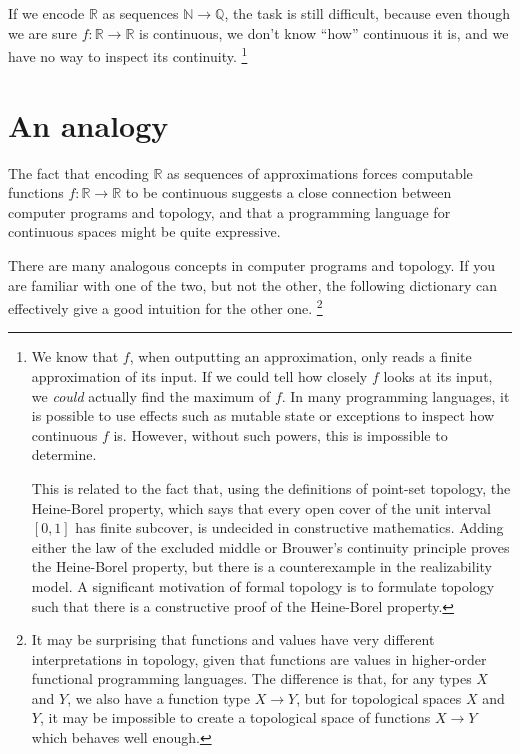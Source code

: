 \documentclass{article}
\newcommand{\nat}{\mathbb{N}}
\newcommand{\rat}{\mathbb{Q}}
\newcommand{\R}{\mathbb{R}}
\begin{document}
If we encode $\R$ as sequences $\nat \to \rat$, the task is still difficult, because even though we are sure $f : \R \to \R$ is continuous, we don't know ``how'' continuous it is, and we have no way to inspect its continuity.
\footnote{We know that $f$, when outputting an approximation, only reads a finite approximation of its input. If we could tell how closely $f$ looks at its input, we \emph{could} actually find the maximum of $f$. In many programming languages, it is possible to use effects such as mutable state or exceptions to inspect how continuous $f$ is. However, without such powers, this is impossible to determine.

This is related to the fact that, using the definitions of point-set topology, the Heine-Borel property, which says that every open cover of the unit interval $[0,1]$ has finite subcover, is undecided in constructive mathematics. Adding either the law of the excluded middle or Brouwer's continuity principle proves the Heine-Borel property, but there is a counterexample in the realizability model. A significant motivation of formal topology is to formulate topology such that there is a constructive proof of the Heine-Borel property.
}

\section{An analogy}

The fact that encoding $\R$ as sequences of approximations forces computable functions $f : \R \to \R$ to be continuous suggests a close connection between computer programs and topology, and that a programming language for continuous spaces might be quite expressive.

There are many analogous concepts in computer programs and topology. If you are familiar with one of the two, but not the other, the following dictionary can effectively give a good intuition for the other one.
\footnote{It may be surprising that functions and values have very different interpretations in topology, given that functions are values in higher-order functional programming languages. The difference is that, for any types $X$ and $Y$, we also have a function type $X \to Y$, but for topological spaces $X$ and $Y$, it may be impossible to create a topological space of functions $X \to Y$ which behaves well enough.}
\end{document}
